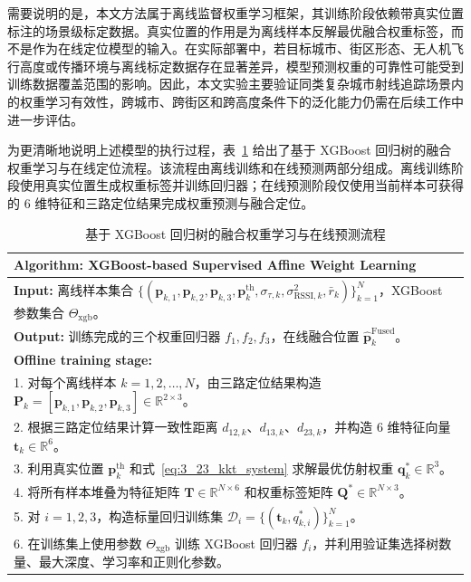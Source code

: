 需要说明的是，本文方法属于离线监督权重学习框架，其训练阶段依赖带真实位置标注的场景级标定数据。真实位置的作用是为离线样本反解最优融合权重标签，而不是作为在线定位模型的输入。在实际部署中，若目标城市、街区形态、无人机飞行高度或传播环境与离线标定数据存在显著差异，模型预测权重的可靠性可能受到训练数据覆盖范围的影响。因此，本文实验主要验证同类复杂城市射线追踪场景内的权重学习有效性，跨城市、跨街区和跨高度条件下的泛化能力仍需在后续工作中进一步评估。

为更清晰地说明上述模型的执行过程，表~\ref{tab:ch3_xgboost_weight_algorithm} 给出了基于 XGBoost 回归树的融合权重学习与在线定位流程。该流程由离线训练和在线预测两部分组成。离线训练阶段使用真实位置生成权重标签并训练回归器；在线预测阶段仅使用当前样本可获得的 6 维特征和三路定位结果完成权重预测与融合定位。

\begin{table}[H]
\centering
\small
\caption{基于 XGBoost 回归树的融合权重学习与在线预测流程}
\label{tab:ch3_xgboost_weight_algorithm}
\begin{tabular}{p{}}
\toprule
\textbf{Algorithm: XGBoost-based Supervised Affine Weight Learning} \\
\midrule
\textbf{Input:} 离线样本集合 \(\{(\mathbf{p}_{k,1},\mathbf{p}_{k,2},\mathbf{p}_{k,3},\mathbf{p}_k^{\mathrm{th}},\sigma_{\tau,k},\sigma^2_{\mathrm{RSSI},k},\bar r_k)\}_{k=1}^{N}\)，XGBoost 参数集合 \(\Theta_{\mathrm{xgb}}\)。\\
\textbf{Output:} 训练完成的三个权重回归器 \(f_1,f_2,f_3\)，在线融合位置 \(\hat{\mathbf{p}}_k^{\mathrm{Fused}}\)。\\
\midrule
\textbf{Offline training stage:}\\
1. 对每个离线样本 \(k=1,2,\ldots,N\)，由三路定位结果构造 \(\mathbf{P}_k=[\mathbf{p}_{k,1},\mathbf{p}_{k,2},\mathbf{p}_{k,3}]\in\mathbb{R}^{2\times3}\)。\\
2. 根据三路定位结果计算一致性距离 \(d_{12,k}\)、\(d_{13,k}\)、\(d_{23,k}\)，并构造 6 维特征向量 \(\mathbf{t}_k\in\mathbb{R}^{6}\)。\\
3. 利用真实位置 \(\mathbf{p}_k^{\mathrm{th}}\) 和式~\eqref{eq:3_23_kkt_system} 求解最优仿射权重 \(\mathbf{q}_k^\ast\in\mathbb{R}^{3}\)。\\
4. 将所有样本堆叠为特征矩阵 \(\mathbf{T}\in\mathbb{R}^{N\times6}\) 和权重标签矩阵 \(\mathbf{Q}^{\ast}\in\mathbb{R}^{N\times3}\)。\\
5. 对 \(i=1,2,3\)，构造标量回归训练集 \(\mathcal{D}_i=\{(\mathbf{t}_k,q_{k,i}^{\ast})\}_{k=1}^{N}\)。\\
6. 在训练集上使用参数 \(\Theta_{\mathrm{xgb}}\) 训练 XGBoost 回归器 \(f_i\)，并利用验证集选择树数量、最大深度、学习率和正则化参数。\\

\end{tabular}
\end{table}
